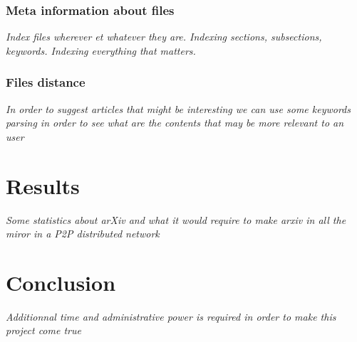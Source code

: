 \subsubsection{Meta information about files}

\textit{Index files wherever et whatever they are. Indexing sections, subsections,
keywords. Indexing everything that matters.}

\subsubsection{Files distance}

\textit{In order to suggest articles that might be interesting we can use
some keywords parsing in order to see what are the contents that may be more
relevant to an user}

\section{Results}

\textit{Some statistics about arXiv and what it would require to make arxiv in
all the miror in a P2P distributed network}

\section{Conclusion}

\textit{Additionnal time and administrative power is required in order to
make this project come true}

